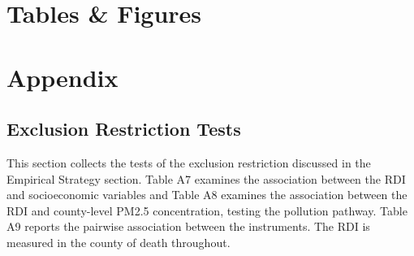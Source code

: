 \documentclass[11pt]{article}
\begin{document}
\section{Tables \& Figures }
\label{sec:tabfig}



\begin{landscape}






\end{landscape}

\section{Appendix}

\setcounter{table}{0}
\setcounter{figure}{0}
\renewcommand{\thetable}{A\arabic{table}}
\renewcommand{\thefigure}{A\arabic{figure}}
\renewcommand{\theHtable}{A\arabic{table}}
\renewcommand{\theHfigure}{A\arabic{figure}}


\begin{landscape}




\end{landscape}


\subsection{Exclusion Restriction Tests}

This section collects the tests of the exclusion restriction discussed in the Empirical Strategy section. Table A7 examines the association between the RDI and socioeconomic variables and Table A8 examines the
association between the RDI and county-level PM2.5 concentration, testing the pollution
pathway. Table A9 reports the pairwise association between the instruments. The RDI is measured in the county of death throughout.
\begin{landscape}

\end{landscape}
\end{document}
